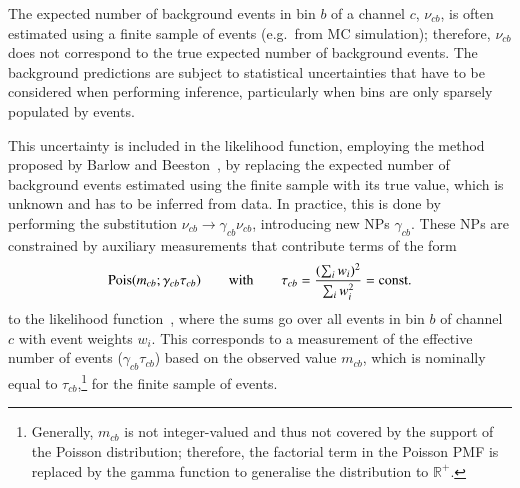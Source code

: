 The expected number of background events in bin $b$ of a channel $c$,
$\nu_{cb}$, is often estimated using a finite sample of events (e.g.\ from MC
simulation); therefore, $\nu_{cb}$ does not correspond to the true expected
number of background events. The background predictions are subject to
statistical uncertainties that have to be considered when performing inference,
particularly when bins are only sparsely populated by events.

This uncertainty is included in the likelihood function, employing the method
proposed by Barlow and Beeston~\cite{barlow1993}, by replacing the expected
number of background events estimated using the finite sample with its true
value, which is unknown and has to be inferred from data. In practice, this is
done by performing the substitution $\nu_{cb} \rightarrow \gamma_{cb} \nu_{cb}$,
introducing new NPs $\gamma_{cb}$.
%
These NPs are constrained by auxiliary measurements that contribute terms of the
form
\begin{align*}
  \operatorname{Pois}(m_{cb} ; \gamma_{cb} \tau_{cb})
  \qquad \text{with} \qquad
  \tau_{cb} = \frac{( \sum_i w_i )^2}{\sum_i w_i^2} = \text{const.}
\end{align*}
to the likelihood function~\cite{cranmer2012}, where the sums go over all events
in bin $b$ of channel $c$ with event weights $w_i$. This corresponds to a
measurement of the effective number of events ($\gamma_{cb} \tau_{cb}$) based on
the observed value $m_{cb}$, which is nominally equal to
$\tau_{cb}$,\footnote{Generally, $m_{cb}$ is not integer-valued and thus not
  covered by the support of the Poisson distribution; therefore, the factorial
  term in the Poisson PMF is replaced by the gamma function to generalise the
  distribution to $\mathbb{R}^+$.} for the finite sample of events.

